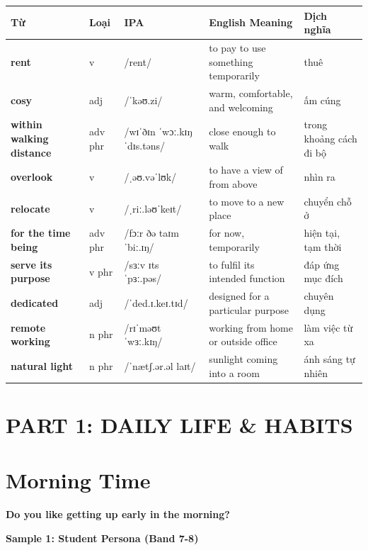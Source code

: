 \vspace{0.8em}
\begin{center}
\renewcommand{\arraystretch}{1.65}
\begin{tabularx}{\textwidth}{|V{0.22\textwidth}|C{0.07\textwidth}|I{0.20\textwidth}|Y|V{0.18\textwidth}|}
\hline
{}
\textbf{Từ} & \textbf{Loại} & \textbf{IPA} & \textbf{English Meaning} & \textbf{Dịch nghĩa} \\
\hline
\textbf{rent} & v & /rent/ & to pay to use something temporarily & thuê \\ \hline
\textbf{cosy} & adj & /ˈkəʊ.zi/ & warm, comfortable, and welcoming & ấm cúng \\ \hline
\textbf{within walking distance} & adv phr & /wɪˈðɪn ˈwɔː.kɪŋ ˈdɪs.təns/ & close enough to walk & trong khoảng cách đi bộ \\ \hline
\textbf{overlook} & v & /ˌəʊ.vəˈlʊk/ & to have a view of from above & nhìn ra \\ \hline
\textbf{relocate} & v & /ˌriː.ləʊˈkeɪt/ & to move to a new place & chuyển chỗ ở \\ \hline
\textbf{for the time being} & adv phr & /fɔːr ðə taɪm ˈbiː.ɪŋ/ & for now, temporarily & hiện tại, tạm thời \\ \hline
\textbf{serve its purpose} & v phr & /sɜːv ɪts ˈpɜː.pəs/ & to fulfil its intended function & đáp ứng mục đích \\ \hline
\textbf{dedicated} & adj & /ˈded.ɪ.keɪ.tɪd/ & designed for a particular purpose & chuyên dụng \\ \hline
\textbf{remote working} & n phr & /rɪˈməʊt ˈwɜː.kɪŋ/ & working from home or outside office & làm việc từ xa \\ \hline
\textbf{natural light} & n phr & /ˈnætʃ.ər.əl laɪt/ & sunlight coming into a room & ánh sáng tự nhiên \\ \hline
\end{tabularx}
\end{center}

\newpage

\section*{PART 1: DAILY LIFE \& HABITS}

\section{Morning Time}
\begin{ieltsquestion}
\textbf{Do you like getting up early in the morning?}
\end{ieltsquestion}
\textbf{Sample 1: Student Persona (Band 7-8)}

